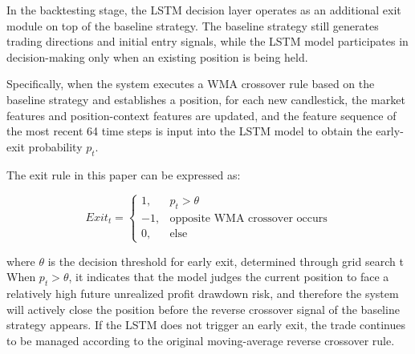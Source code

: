 \documentclass[12pt]{article}
\begin{document}
In the backtesting stage, the LSTM decision layer operates as an additional exit module on top 
of the baseline strategy. The baseline strategy still generates trading directions and initial 
entry signals, while the LSTM model participates in decision-making only when an existing 
position is being held.

Specifically, when the system executes a WMA crossover rule based on the baseline strategy and 
establishes a position, for each new candlestick, the market features and position-context 
features are updated, and the feature sequence of the most recent 64 time steps is input into 
the LSTM model to obtain the early-exit probability $p_t$.

The exit rule in this paper can be expressed as:

\begin{equation}
    Exit_t =
    \begin{cases}
    1, & p_t > \theta \\
    -1, & \text{opposite WMA crossover occurs} \\
    0, & \text{else}
    \end{cases}
\end{equation}

where $\theta$ is the decision threshold for early exit, determined through grid search%
t%
When $p_t > \theta$, it indicates 
that the model judges the current position to face a relatively high future unrealized profit 
drawdown risk, and therefore the system will actively close the position before the reverse 
crossover signal of the baseline strategy appears. If the LSTM does not trigger an early exit, 
the trade continues to be managed according to the original moving-average reverse crossover 
rule.
\end{document}

